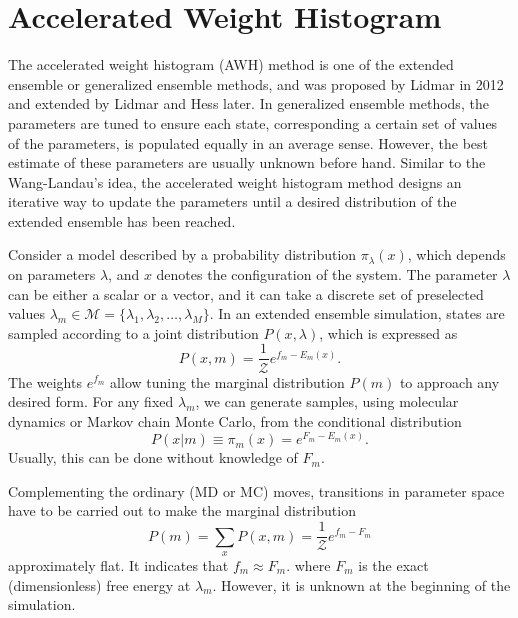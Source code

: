 \section{Accelerated Weight Histogram\label{Sec:ES:AWH}}
The accelerated weight histogram (AWH) method is one of the extended ensemble or generalized ensemble methods, and was proposed by Lidmar in 2012\cite{LidmarPRE2012} and extended by Lidmar and Hess later\cite{LindahlJCP2014,LundborgJCP2021}. In generalized ensemble methods, the parameters are tuned to ensure each state, corresponding a certain set of values of the parameters, is populated equally in an average sense. However, the best estimate of these parameters are usually unknown before hand. Similar to the Wang-Landau's idea, the accelerated weight histogram method designs an iterative way to update the parameters until a desired distribution of the extended ensemble has been reached.

Consider a model described by a probability distribution $\pi_\lambda(x)$, which depends on parameters $\lambda$, and $x$ denotes the configuration of the system. The parameter $\lambda$ can be either a scalar or a vector, and it can take a discrete set of preselected values $\lambda_m\in \mathcal{M}=\{\lambda_1,\lambda_2,\dots,\lambda_M\}$. In an extended ensemble simulation, states are sampled according to a joint distribution $P(x,\lambda)$, which is expressed as
\begin{equation}
	P(x,m)=\frac{1}{\mathcal{Z}}e^{f_m-E_m(x)}.
\end{equation} 
The weights $e^{f_m}$ allow tuning the marginal distribution $P(m)$ to approach any desired form. For any fixed $\lambda_m$, we can generate samples, using molecular dynamics or Markov chain Monte Carlo, from the conditional distribution
\begin{equation}
	P(x|m)\equiv \pi_m(x)=e^{F_m-E_m(x)}.
\end{equation}
Usually, this can be done without knowledge of $F_m$. 

Complementing the ordinary (MD or MC) moves, transitions in parameter space have to be carried out to make the marginal distribution
\begin{equation}
	P(m)=\sum_x P(x,m)=\frac{1}{\mathcal{Z}}e^{f_m-F_m}
\end{equation}
approximately flat. It indicates that $f_m\approx F_m$. where $F_m$ is the exact (dimensionless) free energy at $\lambda_m$. However, it is unknown at the beginning of the simulation.

